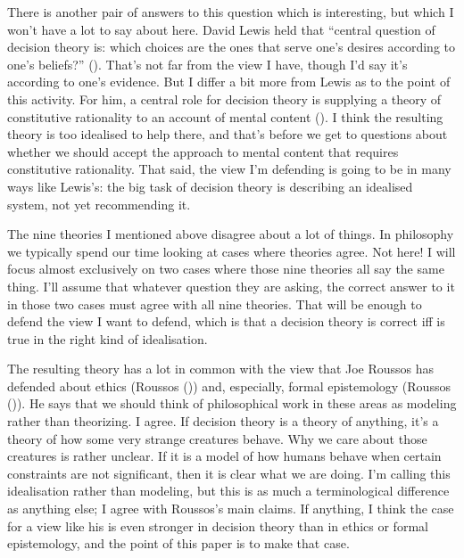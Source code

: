 \documentclass[
  12pt,
  letterpaper,
  DIV=11,
  numbers=noendperiod,
  twoside]{scrartcl}
\begin{document}
There is another pair of answers to this question which is interesting,
but which I won't have a lot to say about here. David Lewis held that
``central question of decision theory is: which choices are the ones
that serve one's desires according to one's beliefs?''
().
That's not far from the view I have, though I'd say it's according to
one's evidence. But I differ a bit more from Lewis as to the point of
this activity. For him, a central role for decision theory is supplying
a theory of constitutive rationality to an account of mental content
(). I think the resulting
theory is too idealised to help there, and that's before we get to
questions about whether we should accept the approach to mental content
that requires constitutive rationality. That said, the view I'm
defending is going to be in many ways like Lewis's: the big task of
decision theory is describing an idealised system, not yet recommending
it.

The nine theories I mentioned above disagree about a lot of things. In
philosophy we typically spend our time looking at cases where theories
agree. Not here! I will focus almost exclusively on two cases where
those nine theories all say the same thing. I'll assume that whatever
question they are asking, the correct answer to it in those two cases
must agree with all nine theories. That will be enough to defend the
view I want to defend, which is that a decision theory is correct iff is
true in the right kind of idealisation.

The resulting theory has a lot in common with the view that Joe Roussos
has defended about ethics (Roussos ())
and, especially, formal epistemology (Roussos
()). He says that we should think of
philosophical work in these areas as modeling rather than theorizing. I
agree. If decision theory is a theory of anything, it's a theory of how
some very strange creatures behave. Why we care about those creatures is
rather unclear. If it is a model of how humans behave when certain
constraints are not significant, then it is clear what we are doing. I'm
calling this idealisation rather than modeling, but this is as much a
terminological difference as anything else; I agree with Roussos's main
claims. If anything, I think the case for a view like his is even
stronger in decision theory than in ethics or formal epistemology, and
the point of this paper is to make that case.
\end{document}
